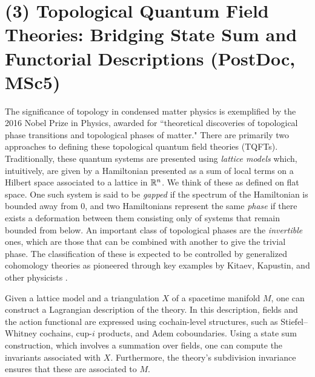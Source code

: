 
\section*{(3) Topological Quantum Field Theories: Bridging State Sum and Functorial Descriptions (PostDoc, MSc5)}

The significance of topology in condensed matter physics is exemplified by the 2016 Nobel Prize in Physics, awarded for ``theoretical discoveries of topological phase transitions and topological phases of matter."
There are primarily two approaches to defining these topological quantum field theories (TQFTs).
Traditionally, these quantum systems are presented using \textit{lattice models} which, intuitively, are given by a Hamiltonian presented as a sum of local terms on a Hilbert space associated to a lattice in $\mathbb{R}^n$.
We think of these as defined on flat space.
One such system is said to be \textit{gapped} if the spectrum of the Hamiltonian is bounded away from $0$, and two Hamiltonians represent the same \textit{phase} if there exists a deformation between them consisting only of systems that remain bounded from below.
An important class of topological phases are the \textit{invertible} ones, which are those that can be combined with another to give the trivial phase.
The classification of these is expected to be controlled by generalized cohomology theories as pioneered through key examples by Kitaev, Kapustin, and other physicists \cite{kitaev2009periodic,kapustin2015cobordism}.

Given a lattice model and a triangulation $X$ of a spacetime manifold $M$, one can construct a Lagrangian description of the theory. In this description, fields and the action functional are expressed using cochain-level structures, such as Stiefel--Whitney cochains, cup-$i$ products, and Adem coboundaries. Using a state sum construction, which involves a summation over fields, one can compute the invariants associated with $X$. Furthermore, the theory's subdivision invariance ensures that these are associated to $M$.

